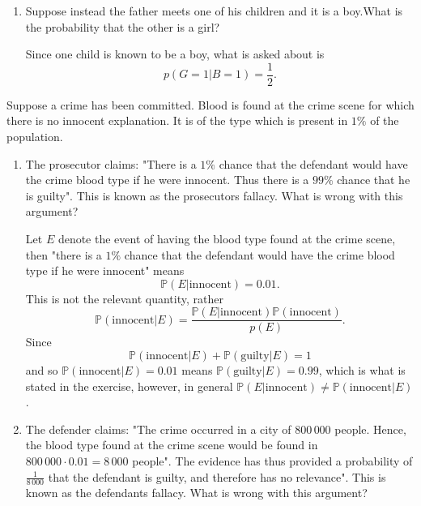 \begin{example}
\begin{enumerate}
		\item Suppose instead the father meets one of his children and it is a boy.What is the probability that the other is a girl?
		
		Since one child is known to be a boy, what is asked about is
		\begin{equation}
			p(G=1|B=1)=\frac{1}{2}.
		\end{equation}
	\end{enumerate}
\end{example}


\begin{example}
	Suppose a crime has been committed. Blood is found at the crime scene for which there is no innocent explanation. It is of the type which is present in $1\%$ of the population.
	
	\begin{enumerate}
		\item The prosecutor claims: "There is a $1\%$ chance that the defendant would have the crime blood type if he were innocent. Thus there is a $99\%$ chance that he is guilty". This is known as the prosecutors fallacy. What is wrong with this argument?
		
		Let $E$ denote the event of having the blood type found at the crime scene, then "there is a $1\%$ chance that the defendant would have the crime blood type if he were innocent" means
		\begin{equation}
			\mathbb{P}(E|\text{innocent})=0.01.
		\end{equation}
		This is not the relevant quantity, rather
		\begin{equation}
			\mathbb{P}(\text{innocent}|E)=\frac{\mathbb{P}(E|\text{innocent})\mathbb{P}(\text{innocent})}{p(E)}.
		\end{equation}
		Since
		\begin{equation}
			\mathbb{P}(\text{innocent}|E)+\mathbb{P}(\text{guilty}|E)=1
		\end{equation}
		and so $\mathbb{P}(\text{innocent}|E)=0.01$ means $\mathbb{P}(\text{guilty}|E)=0.99$, which is what is stated in the exercise, however, in general \(\mathbb{P}(E|\text{innocent})\neq \mathbb{P}(\text{innocent}|E)\).
		
		\item The defender claims: "The crime occurred in a city of $800\, 000$ people. Hence, the blood type found at the crime scene would be found in $800\, 000 \cdot 0.01=8\, 000$ people". The evidence has thus provided a probability of $\frac{1}{8\, 000}$ that the defendant is guilty, and therefore has no relevance". This is known as the defendants fallacy. What is wrong with this argument?
		

\end{enumerate}
\end{example}
